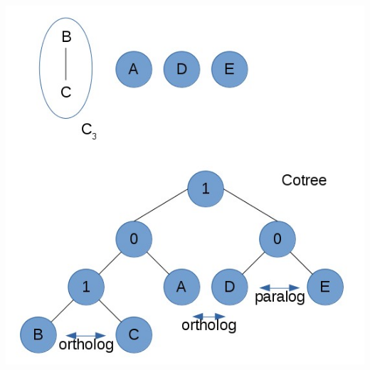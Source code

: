 \begin{enumerate}
\begin{center}
		\includegraphics[scale=0.55]{lectures/161202/pix/12.jpg}
	\end{center}
\end{enumerate}